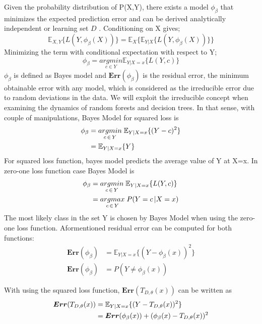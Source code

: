 Given the probability distribution of P(X,Y), there exists a model $\phi_{\beta}$ that minimizes the expected prediction error 
and can be derived analytically independent or learning set $D$ \cite{louppe2014understanding}. Conditioning on X gives;
\begin{equation}
\mathbb{E}_{X,Y} \{L(Y, \phi_{\beta}(X))\} = \mathbb{E}_{X}\{\mathbb{E}_{Y|X}\{L(Y, \phi_{\beta}(X)) \} \}
\end{equation}
Minimizing the term with conditional expectation with respect to Y;
\begin{equation}
\phi_{\beta} = \underset{c \in Y}{argmin} \mathbb{E}_{Y|X=x}\{L(Y,c)\}
\end{equation}
$\phi_{\beta}$ is defined as Bayes model and $\boldsymbol{Err}(\phi_{\beta})$ is the residual error, 
the minimum obtainable error with any model, which is considered as the irreducible error due to random deviations in the 
data\cite{louppe2014understanding}. We will exploit the irreducible concept when examining the dynamics of random forests and 
decision trees. In that sense, with couple of manipulations, Bayes Model for squared loss is
\begin{align}
\phi_{\beta} & = \underset{c \,\in\, Y}{argmin} \; \mathbb{E}_{Y|X=x}\{(Y-c)^2 \} \notag\\
			 & = \mathbb{E}_{Y|X=x}\{Y\}
\end{align}
For squared loss function, bayes model predicts the average value of Y at X=x. In zero-one loss function case Bayes Model is
\begin{align}\label{eq:bayes_model}
\phi_{\beta} & = \underset{c \,\in\, Y}{argmin} \; \mathbb{E}_{Y|X=x}\{L(Y,c) \} \notag\\
			 & = \underset{c \,\in\, Y}{argmax} \; P(Y = c \,| X = x)
\end{align}
The most likely class in the set Y is chosen by Bayes Model when using the zero-one loss function. 
Aformentioned residual error can be computed for both functions:
\begin{align}
\boldsymbol{Err}(\phi_{\beta}) & = \mathbb{E}_{Y|X=x}\{(Y-\phi_{\beta}(x))^2 \}\\
\boldsymbol{Err}(\phi_{\beta}) & = P(Y \neq \phi_{\beta}(x) )
\end{align}

With using the squared loss function, $\boldsymbol{Err}(T_{D,\theta}(x))$ can be written as
\begin{align}\label{eq:decomp_squared_loss}
\boldsymbol{Err}(T_{D, \theta}(x)) & = \mathbb{E}_{Y|X=x}\{(Y-T_{D,\theta}(x))^2\} \notag \\
							   	  & = \boldsymbol{Err}(\phi_{\beta}(x)) + (\phi_{\beta}(x)-T_{D,\theta}(x))^2
\end{align}

